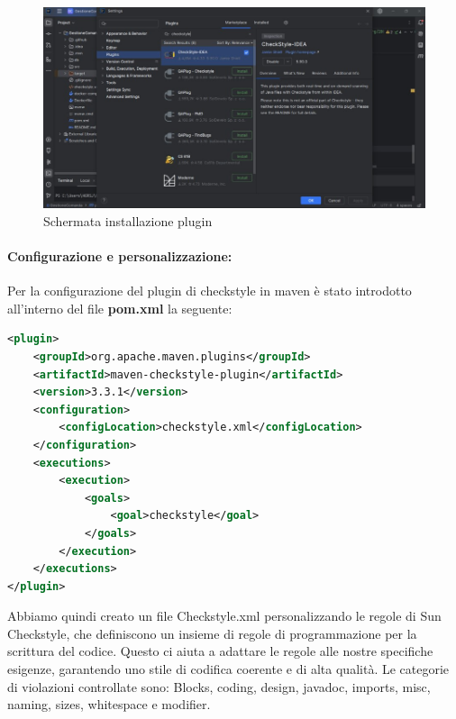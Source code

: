 \begin{figure}[htbp]
	\centering
	\includegraphics[scale=0.8]{iterazione1/images/Install_checkstyle_intelliJ.jpg}
	\caption{Schermata installazione plugin\label{fig:Install_checkstyle_intelliJ}}
\end{figure}

\paragraph{Configurazione e personalizzazione:}
Per la configurazione del plugin di checkstyle in maven è stato introdotto all'interno del file \textbf{pom.xml} la seguente: 

\begin{lstlisting}[language=XML, caption={plugin Maven con Maven Checkstyle Plugin}]
<plugin>
	<groupId>org.apache.maven.plugins</groupId>
	<artifactId>maven-checkstyle-plugin</artifactId>
	<version>3.3.1</version>
	<configuration>
		<configLocation>checkstyle.xml</configLocation>
	</configuration>
	<executions>
		<execution>
			<goals>
				<goal>checkstyle</goal>
			</goals>
		</execution>
	</executions>
</plugin>
\end{lstlisting}

Abbiamo quindi creato un file Checkstyle.xml personalizzando le regole di Sun Checkstyle, che definiscono un insieme di regole di programmazione per la scrittura del codice. Questo ci aiuta a adattare le regole alle nostre specifiche esigenze, garantendo uno stile di codifica coerente e di alta qualità. Le categorie di violazioni controllate sono: Blocks, coding, design, javadoc, imports, misc, naming, sizes, whitespace e modifier.

